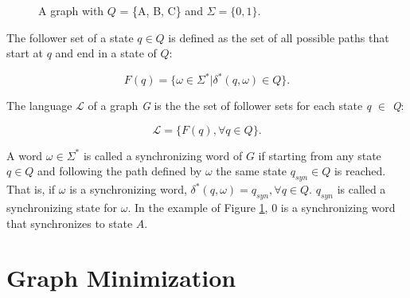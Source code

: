 {\begin{figure}
\centering
{}
\caption{A graph with $Q$ = \{A, B, C\} and $\Sigma = \{0, 1\}$.\label{fig:graph}}
\end{figure}


\begin{definition}\label{def:followerset}
The follower set of a state $q \in Q$ is defined as the set of all possible paths that start at $q$ and end in a state of $Q$:
\end{definition}

\[ F(q) = \{\omega \in \Sigma^* | \delta^*(q, \omega) \in \textit{Q}\}. \]


\begin{definition}\label{def:language}
The language $\mathcal{L}$ of a graph \textit{G} is the the set of follower sets for each state \textit{q} $\in$ \textit{Q}:
\end{definition}

\[ \mathcal{L} = \{F(\textit{q}), \forall \textit{q} \in \textit{Q}\}. \]

A word $\omega \in \Sigma^*$ is called a synchronizing word of $G$ if starting from any state $q \in Q$ and following the path defined by $\omega$ the same state $q_{syn} \in Q$ is reached. That is, if $\omega$ is a synchronizing word, $\delta^*(q, \omega) = q_{syn}, \forall q \in Q$. $q_{syn}$ is called a synchronizing state for $\omega$. In the example of Figure \ref{fig:graph}, $0$ is a synchronizing word that synchronizes to state $A$.

\section{Graph Minimization}

}
